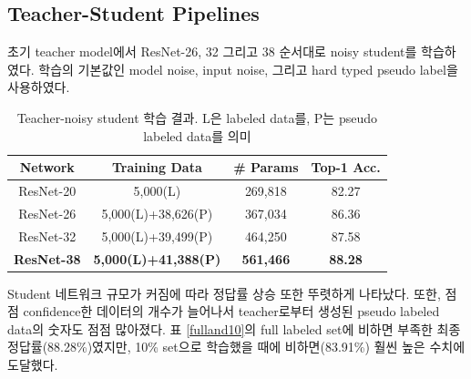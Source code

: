 \documentclass[a4paper, 10pt]{article}
\begin{document}
\subsection{Teacher-Student Pipelines}
초기 teacher model에서 ResNet-26, 32 그리고 38 순서대로 noisy student를
학습하였다. 학습의 기본값인 model noise, input noise, 그리고 hard typed pseudo
label을 사용하였다.
\begin{table}[!h]
  \center
  \begin{tabular}{|c|c|c|c|}
\hline
Network & Training Data & \# Params & Top-1 Acc. \\ \hline
ResNet-20 & 5,000(L) & 269,818 & 82.27 \\ \hline
ResNet-26 & 5,000(L)+38,626(P) & 367,034 & 86.36 \\
ResNet-32 & 5,000(L)+39,499(P) & 464,250 & 87.58 \\
\textbf{ResNet-38} & \textbf{5,000(L)+41,388(P)} 
& \textbf{561,466} & \textbf{88.28} \\ \hline
  \end{tabular}
  \caption{Teacher-noisy student 학습 결과. L은 labeled data를, P는 pseudo labeled data를 의미}
  \label{noisyhard}
\end{table}
Student 네트워크 규모가 커짐에 따라 정답률 상승 또한 뚜렷하게 나타났다. 또한,
점점 confidence한 데이터의 개수가 늘어나서 teacher로부터 생성된 pseudo labeled
data의 숫자도 점점 많아졌다. 표 \ref{fulland10}의 full labeled set에 비하면
부족한 최종 정답률(88.28\%)였지만, 10\% set으로 학습했을 때에 비하면(83.91\%)
훨씬 높은 수치에 도달했다.
\end{document}
